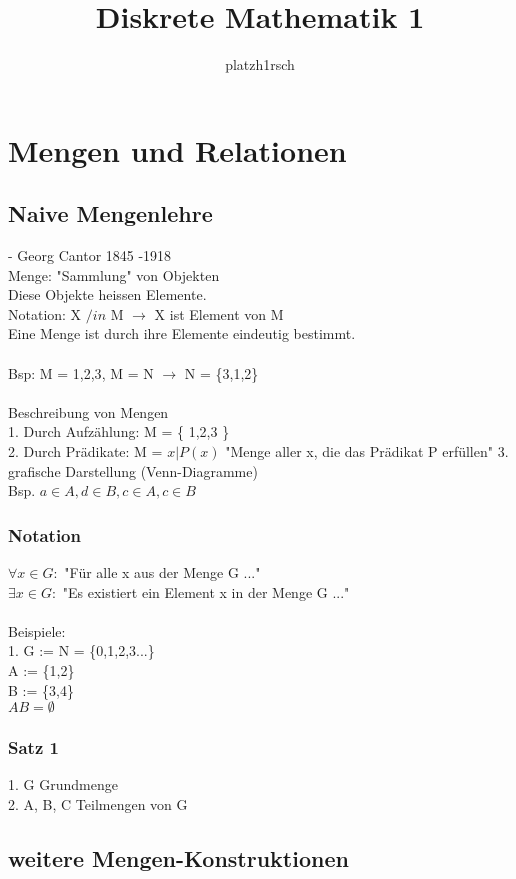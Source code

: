 \documentclass[11pt,a4paper]{article}
\author{platzh1rsch}
\title{Diskrete Mathematik 1}
\begin{document}
\section{Mengen und Relationen}
\subsection{Naive Mengenlehre}
- Georg Cantor 1845 -1918 \\
Menge: "Sammlung" von Objekten\\
Diese Objekte heissen Elemente.\\
Notation: X $ /in $ M $\rightarrow$ X ist Element von M\\
Eine Menge ist durch ihre Elemente eindeutig bestimmt.\\
\\
Bsp: M = {1,2,3}, M = N $\rightarrow$ N = \{3,1,2\}\\
\\
Beschreibung von Mengen\\
1. Durch Aufzählung: M = \{ 1,2,3 \}\\
2. Durch Prädikate:  M = ${x | P(x)}$  "Menge aller x, die das Prädikat P erfüllen"
3. grafische Darstellung (Venn-Diagramme)\\
Bsp. $a \in A, d \in B, c \in A, c \in B$\\

\subsubsection{Notation}
$\forall x \in G: $   "Für alle x aus der Menge G ..."\\
$\exists x \in G: $   "Es existiert ein Element x in der Menge G ..."\\\\
Beispiele:\\
1. G := N = \{0,1,2,3...\}\\
   A := \{1,2\}\\
   B := \{3,4\}\\
$   A B = \emptyset$\\

\subsubsection{Satz 1}
1. G Grundmenge \\
2. A, B, C Teilmengen von G \\

\subsection{weitere Mengen-Konstruktionen}
\end{document}
